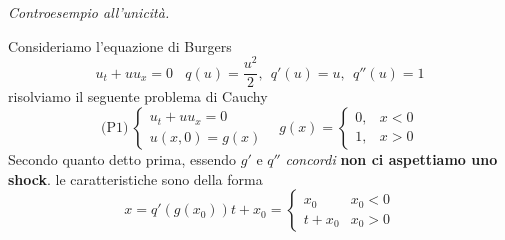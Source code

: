 \documentclass[10pt,a4paper,twoside,openright]{book}
\begin{document}
\textit{Controesempio all'unicità.}

Consideriamo l'equazione di Burgers
\begin{equation}
	u_{t} +uu_{x} =0\ \ \ \ q( u) =\frac{u^{2}}{2} ,\ \ q'( u) =u,\ \ q''( u) =1
\end{equation}
risolviamo il seguente problema di Cauchy
\begin{equation*}
	\text{(P1)} \ 
	\begin{cases}
		u_{t} +uu_{x} =0 \\
		u( x,0) =g( x)   
	\end{cases} \ \ \ \ g( x) =
	\begin{cases}
		0, & x< 0 \\
		1, & x >0 
	\end{cases}
\end{equation*}
Secondo quanto detto prima, essendo $g'$ e $q''$ \emph{concordi} \textbf{non ci aspettiamo uno shock}.
le caratteristiche sono della forma
\begin{equation*}
	x=q'( g( x_{0})) t+x_{0} =
	\begin{cases}
		x_{0}   & x_{0} < 0 \\
		t+x_{0} & x_{0}  >0 
	\end{cases}
\end{equation*}
\end{document}
